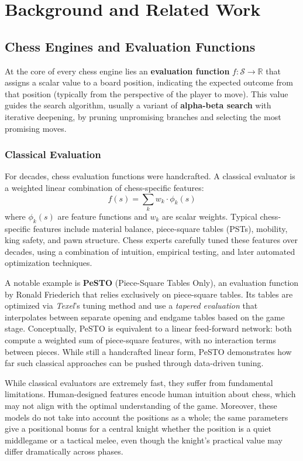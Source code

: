 \chapter[Background and Related Work]{Background and Related Work}\label{ch:background}

\section{Chess Engines and Evaluation Functions}\label{sec:engines}

At the core of every chess engine lies an \textbf{evaluation function} \(f: \mathcal{S} \rightarrow \mathbb{R}\) that assigns a scalar value to a board position, indicating the expected outcome from that position (typically from the perspective of the player to move). This value guides the search algorithm, usually a variant of \textbf{alpha-beta search} with iterative deepening, by pruning unpromising branches and selecting the most promising moves.

\subsection{Classical Evaluation}\label{sec:classical-eval}

For decades, chess evaluation functions were handcrafted. A classical evaluator is a weighted linear combination of chess-specific features:
\[
f(s) = \sum_{k} w_k \cdot \phi_k(s)
\]
where \(\phi_k(s)\) are feature functions and \(w_k\) are scalar weights. Typical chess-specific features include material balance, piece-square tables (PSTs), mobility, king safety, and pawn structure. Chess experts carefully tuned these features over decades, using a combination of intuition, empirical testing, and later automated optimization techniques.

A notable example is \textbf{PeSTO} (Piece-Square Tables Only), an evaluation function by Ronald Friederich that relies exclusively on piece-square tables. Its tables are optimized via \emph{Texel}'s tuning method and use a \emph{tapered evaluation} that interpolates between separate opening and endgame tables based on the game stage. Conceptually, PeSTO is equivalent to a linear feed-forward network: both compute a weighted sum of piece-square features, with no interaction terms between pieces. While still a handcrafted linear form, PeSTO demonstrates how far such classical approaches can be pushed through data-driven tuning.

While classical evaluators are extremely fast, they suffer from fundamental limitations. Human-designed features encode human intuition about chess, which may not align with the optimal understanding of the game. Moreover, these models do not take into account the positions as a whole; the same parameters give a positional bonus for a central knight whether the position is a quiet middlegame or a tactical melee, even though the knight's practical value may differ dramatically across phases.

